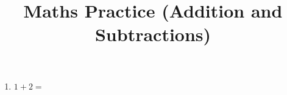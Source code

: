 \documentclass[11pt]{article}
\title{Maths Practice (Addition and Subtractions)}
\begin{document}
\maketitle

\begin{enumerate}
	\item $ 1 + 2 =$
\end{enumerate}
\end{document}
